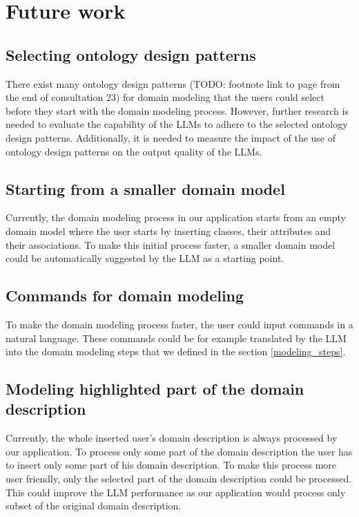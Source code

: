 \chapter{Future work}


\section{Selecting ontology design patterns}

There exist many ontology design patterns (TODO: footnote link to page from the end of consultation 23) for domain modeling that the users could select before they start with the domain modeling process. However, further research is needed to evaluate the capability of the LLMs to adhere to the selected ontology design patterns. Additionally, it is needed to measure the impact of the use of ontology design patterns on the output quality of the LLMs. 


\section{Starting from a smaller domain model}

Currently, the domain modeling process in our application starts from an empty domain model where the user starts by inserting classes, their attributes and their associations. To make this initial process faster, a smaller domain model could be automatically suggested by the LLM as a starting point.


\section{Commands for domain modeling}

To make the domain modeling process faster, the user could input commands in a natural language. These commands could be for example translated by the LLM into the domain modeling steps that we defined in the section \ref{modeling_steps}.


\section{Modeling highlighted part of the domain description}

Currently, the whole inserted user's domain description is always processed by our application. To process only some part of the domain description the user has to insert only some part of his domain description. To make this process more user friendly, only the selected part of the domain description could be processed. This could improve the LLM performance as our application would process only subset of the original domain description.


